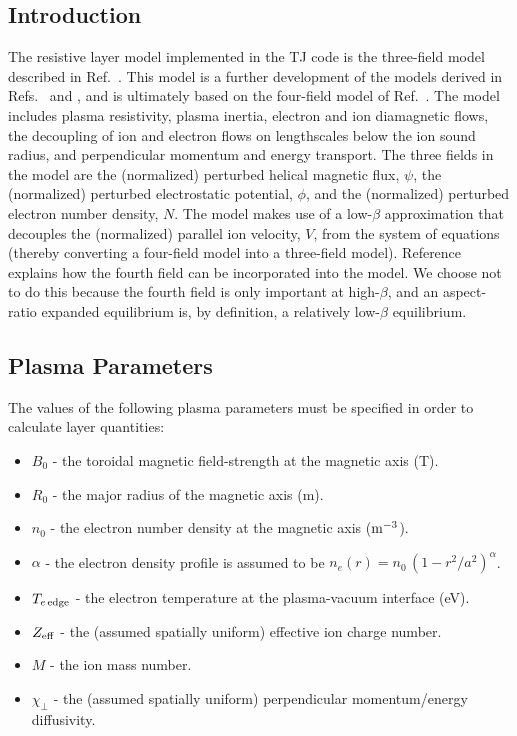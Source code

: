 \documentclass[12pt,prb,aps]{revtex4-1}
\begin{document}
\subsection{Introduction}
 The resistive layer model implemented in the TJ code is the three-field model described in Ref.~. This model is a further development of
 the models derived in Refs.~ and , and is ultimately based on the four-field model of Ref.~. 
 The model includes plasma resistivity, plasma inertia, electron and ion diamagnetic flows, the decoupling of ion and electron flows on lengthscales below the ion sound
 radius, and perpendicular momentum and energy transport. The three fields in the model are the (normalized) perturbed helical magnetic flux, $\psi$, the (normalized)
 perturbed electrostatic potential, $\phi$, and the (normalized) perturbed electron number density, $N$. The model makes use of a low-$\beta$
 approximation that decouples the (normalized) parallel ion velocity, $V$,  from the system of equations (thereby converting a four-field model into
 a three-field model). Reference~ explains how the fourth field can be incorporated into the model. We choose not to do this
 because the fourth field is only important at high-$\beta$, and an aspect-ratio expanded equilibrium is, by definition, a relatively low-$\beta$
 equilibrium. 
 
\subsection{Plasma Parameters}
The values of the following plasma parameters must be specified in order to calculate layer quantities:
\begin{itemize}
\item $B_0$ - the toroidal magnetic field-strength at the magnetic axis (T).
\item $R_0$ - the major radius of the magnetic axis  (m).
\item $n_0$ - the  electron number density at the magnetic axis (${\rm m}^{-3}$).
\item $\alpha$ - the electron density profile is assumed to be $n_e(r)=n_0\,(1-r^2/a^2)^\alpha$.
\item $T_{e\,{\rm edge}}$ - the electron temperature at the plasma-vacuum interface (eV).
\item $Z_{\rm eff}$  - the (assumed spatially uniform) effective ion charge number.
\item $M$ - the ion mass number.
\item $\chi_\perp$ - the (assumed spatially uniform) perpendicular momentum/energy diffusivity.
\end{itemize}
\end{document}
